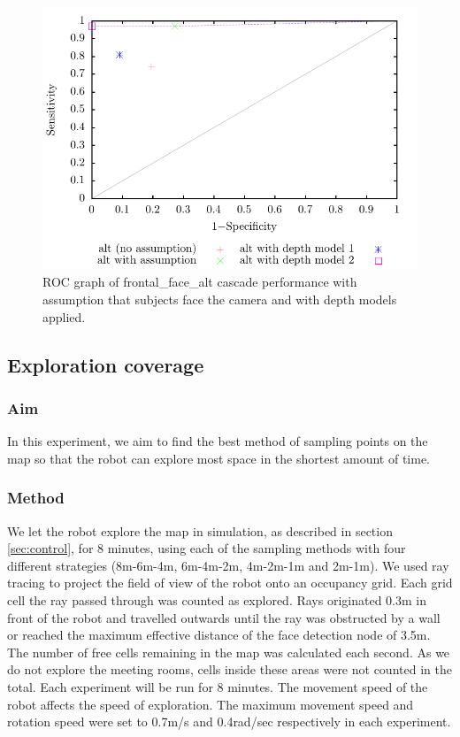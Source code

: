 \documentclass[conference]{IEEEtran}
\begin{document}
\begin{figure}
  \includegraphics[width=\columnwidth]{kinect_ROC}
  \caption{ROC graph of frontal\_face\_alt cascade performance with assumption that subjects face the camera and with depth models applied.}
  \label{fig:cascade_with_model}
\end{figure}
\subsection{Exploration coverage}
\subsubsection{Aim}
In this experiment, we aim to find the best method of sampling points on the map so that the robot can explore most space in the shortest amount of time.
\subsubsection{Method}
We let the robot explore the map in simulation, as described in section \ref{sec:control}, for 8 minutes, using each of the sampling methods with four different strategies (8m-6m-4m, 6m-4m-2m, 4m-2m-1m and 2m-1m). We used ray tracing to project the field of view of the robot onto an occupancy grid. Each grid cell the ray passed through was counted as explored. Rays originated 0.3m in front of the robot and travelled outwards until the ray was obstructed by a wall or reached the maximum effective distance of the face detection node of 3.5m. The number of free cells remaining in the map was calculated each second. As we do not explore the meeting rooms, cells inside these areas were not counted in the total. Each experiment will be run for 8 minutes. The movement speed of the robot affects the speed of exploration. The maximum movement speed and rotation speed were set to 0.7m/s and 0.4rad/sec respectively in each experiment.
\end{document}
